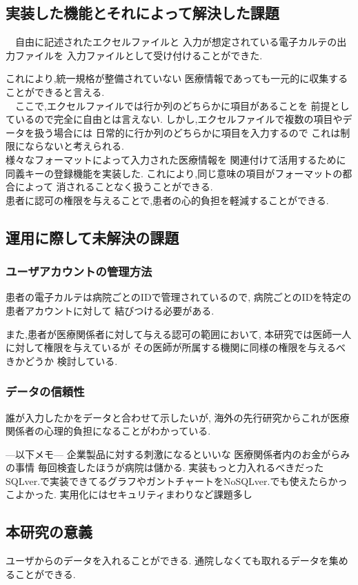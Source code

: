 \subsection{実装した機能とそれによって解決した課題}
  　自由に記述されたエクセルファイルと
  入力が想定されている電子カルテの出力ファイルを
  入力ファイルとして受け付けることができた.

  これにより,統一規格が整備されていない
  医療情報であっても一元的に収集することができると言える.
  \\

  　ここで,エクセルファイルでは行か列のどちらかに項目があることを
  前提としているので完全に自由とは言えない.
  しかし,エクセルファイルで複数の項目やデータを扱う場合には
  日常的に行か列のどちらかに項目を入力するので
  これは制限にならないと考えられる.
  \\
  様々なフォーマットによって入力された医療情報を
  関連付けて活用するために同義キーの登録機能を実装した.
  これにより,同じ意味の項目がフォーマットの都合によって
  消されることなく扱うことができる.
  \\
  患者に認可の権限を与えることで,患者の心的負担を軽減することができる.



\subsection{運用に際して未解決の課題}
  \subsubsection{ユーザアカウントの管理方法}
    患者の電子カルテは病院ごとのIDで管理されているので,
    病院ごとのIDを特定の患者アカウントに対して
    結びつける必要がある.

    また,患者が医療関係者に対して与える認可の範囲において,
    本研究では医師一人に対して権限を与えているが
    その医師が所属する機関に同様の権限を与えるべきかどうか
    検討している.


  \subsubsection{データの信頼性}
     誰が入力したかをデータと合わせて示したいが,
     海外の先行研究からこれが医療関係者の心理的負担になることがわかっている.
     \cite{bibi10}

---以下メモ---
企業製品に対する刺激になるといいな
医療関係者内のお金がらみの事情
   毎回検査したほうが病院は儲かる.
実装もっと力入れるべきだった
    SQLver.で実装できてるグラフやガントチャートをNoSQLver.でも使えたらかっこよかった.
実用化にはセキュリティまわりなど課題多し

 \subsection{本研究の意義}
   ユーザからのデータを入れることができる.
   通院しなくても取れるデータを集めることができる.
